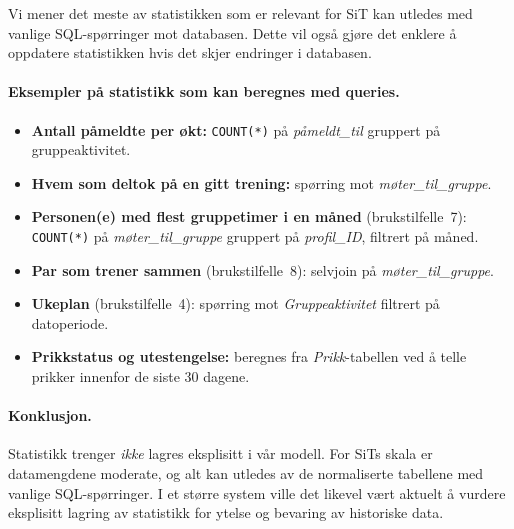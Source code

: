 Vi mener det meste av statistikken som er relevant for SiT kan utledes med vanlige
SQL-spørringer mot databasen. Dette vil også gjøre det enklere å oppdatere statistikken hvis det skjer endringer i databasen.

\paragraph{Eksempler på statistikk som kan beregnes med queries.}
\begin{itemize}
    \item \textbf{Antall påmeldte per økt:}
          \texttt{COUNT(*)} på \textit{påmeldt\_til} gruppert på gruppeaktivitet.
    \item \textbf{Hvem som deltok på en gitt trening:}
          spørring mot \textit{møter\_til\_gruppe}.
    \item \textbf{Personen(e) med flest gruppetimer i en måned} (brukstilfelle~7):
          \texttt{COUNT(*)} på \textit{møter\_til\_gruppe} gruppert på
          \textit{profil\_ID}, filtrert på måned.
    \item \textbf{Par som trener sammen} (brukstilfelle~8):
          selvjoin på \textit{møter\_til\_gruppe}.
    \item \textbf{Ukeplan} (brukstilfelle~4):
          spørring mot \textit{Gruppeaktivitet} filtrert på datoperiode.
    \item \textbf{Prikkstatus og utestengelse:}
          beregnes fra \textit{Prikk}-tabellen ved å telle prikker
          innenfor de siste 30 dagene.
\end{itemize}

\paragraph{Konklusjon.}
Statistikk trenger \emph{ikke} lagres eksplisitt i vår modell.
For SiTs skala er datamengdene moderate, og alt kan utledes
av de normaliserte tabellene med vanlige SQL-spørringer.
I et større system ville det likevel vært aktuelt å vurdere
eksplisitt lagring av statistikk for ytelse og bevaring av historiske data.
